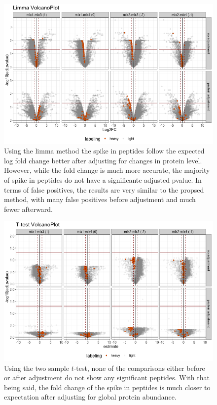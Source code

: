 \documentclass{mcp}
\begin{document}
\begin{figure}[h!]
\centering
\includegraphics[width=.85\textwidth]{sim_new/spike_in_limma_volcano}
\caption{Using the limma method the spike in peptides follow the expected log fold change better after adjusting for changes in protein level. However, while the fold change is much more accurate, the majority of spike in peptides do not have a significante adjusted pvalue. In terms of false positives, the results are very similar to the propsed method, with many false positives before adjustment and much fewer afterward. \label{fig:spike_volcano_limma}}
\end{figure}

\begin{figure}[h!]
\centering
\includegraphics[width=.85\textwidth]{sim_new/spike_in_ttest_volcano}
\caption{Using the two sample $t$-test, none of the comparisons either before or after adjustment do not show any significant peptides. With that being said, the fold change of the spike in peptides is much closer to expectation after adjusting for global protein abundance. \label{fig:spike_volcano_ttest}}
\end{figure}
\end{document}
